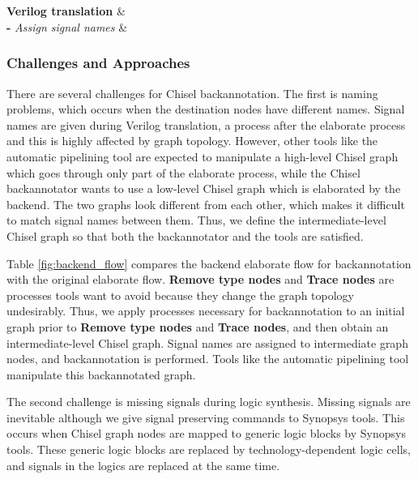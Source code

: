 \begin{table*}
\begin{tabular}
		 \\		
		 \\
		\hline
		{\bf Verilog translation} & \\
		{\bf -} \emph{Assign signal names} & \\
		\hline
	\end{tabular}
	\caption{The original backend elaborate flow and the backannotation backend elaborate flow. Note that signal names are assigned to the intermediate-level Chisel graph in the backannotation backend while they are given during Verilog translation in the original backend.}
	\label{fig:backend_flow}
\end{table*}

\subsubsection{Challenges and Approaches} 
\label{sec:challenges}
There are several challenges for Chisel backannotation. The first is naming problems, which occurs when the destination nodes have different names. Signal names are given during Verilog translation, a process after the elaborate process and this is highly affected by graph topology. However, other tools like the automatic pipelining tool are expected to manipulate a high-level Chisel graph which goes through only part of the elaborate process, while the Chisel backannotator wants to use a low-level Chisel graph which is elaborated by the backend. The two graphs look different from each other, which makes it difficult to match signal names between them. Thus, we define the intermediate-level Chisel graph so that both the backannotator and the tools are satisfied.

Table \ref{fig:backend_flow} compares the backend elaborate flow for backannotation with the original elaborate flow. \textbf{Remove type nodes} and \textbf{Trace nodes} are processes tools want to avoid because they change the graph topology undesirably. Thus, we apply processes necessary for backannotation to an initial graph prior to \textbf{Remove type nodes} and \textbf{Trace nodes}, and then obtain an intermediate-level Chisel graph. Signal names are assigned to intermediate graph nodes, and backannotation is performed. Tools like the automatic pipelining tool manipulate this backannotated graph.

The second challenge is missing signals during logic synthesis. Missing signals are inevitable although we give signal preserving commands to Synopsys tools. This occurs when Chisel graph nodes are mapped to generic logic blocks by Synopsys tools. These generic logic blocks are replaced by technology-dependent logic cells, and signals in the logics are replaced at the same time.

